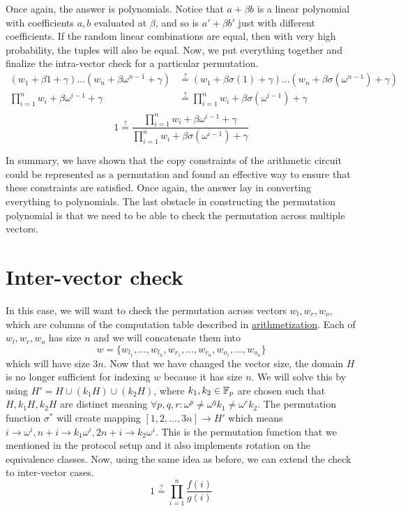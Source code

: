 Once again, the answer is polynomials. Notice that $a + \beta b$ is a linear polynomial with coefficients $a, b$ evaluated at $\beta$, and so is $a' + \beta b'$ just with different coefficients. If the random linear combinations are equal, then with very high probability, the tuples will also be equal. Now, we put everything together and finalize the intra-vector check for a particular permutation.
\begin{align*}
    (w_1 + \beta 1 + \gamma) \ldots  (w_n + \beta \omega^{n-1}+ \gamma) &\stackrel{?}{=} (w_1 + \beta \sigma(1) + \gamma) \ldots (w_n + \beta \sigma(\omega^{n-1}) + \gamma) \\
    \prod_{i = 1}^n w_i + \beta \omega^{i-1}+ \gamma &\stackrel{?}{=} \prod_{i = 1}^n  w_i + \beta \sigma(\omega^{i-1}) + \gamma \\
\end{align*}
$$1 \stackrel{?}{=} \frac{\prod_{i = 1}^n w_i + \beta \omega^{i-1}+ \gamma}{\prod_{i = 1}^n  w_i + \beta \sigma(\omega^{i-1}) + \gamma}$$
    

In summary, we have shown that the copy constraints of the arithmetic circuit could be represented as a permutation and found an effective way to ensure that these constraints are satisfied. Once again, the answer lay in converting everything to polynomials. The last obstacle in constructing the permutation polynomial is that we need to be able to check the permutation across multiple vectors.


\section{Inter-vector check}
In this case, we will want to check the permutation across vectors $w_l, w_r, w_o$, which are columns of the computation table described in \hyperref[chap:arithmetization]{arithmetization}. Each of $w_l, w_r, w_o$ has size $n$ and we will concatenate them into $$w = \{w_{l_1}, \ldots,w_{l_n}, w_{r_1}, \ldots,w_{r_n}, w_{o_1}, \ldots,w_{o_n}\}$$ which will have size $3n$. Now that we have changed the vector size, the domain $H$ is no longer sufficient for indexing $w$ because it has size $n$. We will solve this by using $H' = H \cup (k_1H) \cup (k_2H)$, where $k_1, k_2 \in \mathbb{F}_p$ are chosen such that $H, k_1H, k_2H$ are distinct meaning $\forall p, q, r: \omega^p \neq \omega^q k_1 \neq \omega^r k_2$. The permutation function $\sigma^*$ will create mapping $[1, 2, \ldots, 3n] \rightarrow H'$ which means $i \rightarrow \omega^i, n+i \rightarrow k_1 \omega^i, 2n+i \rightarrow k_2 \omega^i$. This is the permutation function that we mentioned in the protocol setup and it also implements rotation on the equivalence classes. Now, using the same idea as before, we can extend the check to inter-vector cases. $$1 \stackrel{?}{=} \prod_{i=1}^{n} \frac{f(i)}{g(i)}$$

